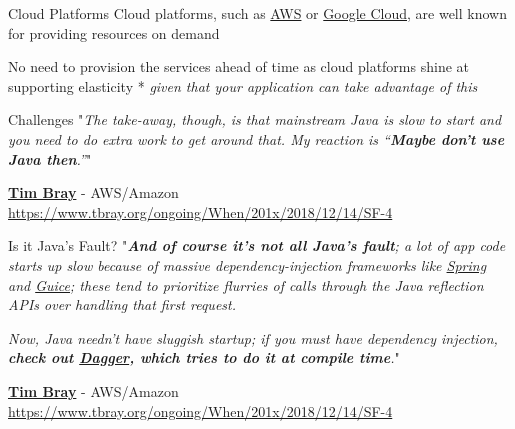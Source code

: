 \documentclass{beamer}
\begin{document}
  \begin{frame}[t]{Cloud Platforms}
    Cloud platforms, such as \href{https://aws.amazon.com/}{AWS} or \href{https://cloud.google.com/}{Google Cloud}, are well known for providing resources on demand

    No need to provision the services ahead of time as cloud platforms shine at supporting elasticity *
    \newline
    {\footnotesize * \textit{given that your application can take advantage of this}}
  \end{frame}


  \begin{frame}[t]{Challenges}
    "\textit{The take-away, though, is that mainstream Java is slow to start and you need to do extra work to get around that. My reaction is “\textbf{Maybe don’t use Java then}.”}"

    \vspace{16pt}
    \href{https://www.linkedin.com/in/timbraysoftwareguy/}{\textbf{Tim Bray}} - AWS/Amazon
    \newline
    {\footnotesize \href{https://www.tbray.org/ongoing/When/201x/2018/12/14/SF-4}{https://www.tbray.org/ongoing/When/201x/2018/12/14/SF-4}}
  \end{frame}


  \begin{frame}[t]{Is it Java's Fault?}
    "\textit{\textbf{And of course it’s not all Java’s fault}; a lot of app code starts up slow because of massive dependency-injection frameworks like \href{https://spring.io/}{Spring} and \href{https://github.com/google/guice}{Guice}; these tend to prioritize flurries of calls through the Java reflection APIs over handling that first request.}

    \textit{Now, Java needn’t have sluggish startup; if you must have dependency injection, \textbf{check out \href{https://github.com/google/dagger}{Dagger}, which tries to do it at compile time}.}"

    \vspace{16pt}
    \href{https://www.linkedin.com/in/timbraysoftwareguy/}{\textbf{Tim Bray}} - AWS/Amazon
    \newline
    {\footnotesize \href{https://www.tbray.org/ongoing/When/201x/2018/12/14/SF-4}{https://www.tbray.org/ongoing/When/201x/2018/12/14/SF-4}}
  \end{frame}
\end{document}
